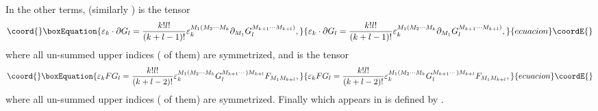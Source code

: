 \documentclass[a4paper,12pt]{article}
\begin{document}
In the other terms, \coordHE{} (similarly \coordHE{}) is the tensor
\begin{equation}\coord{}\boxEquation{
\varepsilon _{k}\cdot \partial G_{l}=\frac{k!l!}{\left( k+l-1\right) !}
\varepsilon _{k}^{M_{1}(M_{2}\cdots M_{k}}\partial
_{M_{1}}G_{l}^{M_{k+1}\cdots M_{k+l})},
}{
\varepsilon _{k}\cdot \partial G_{l}=\frac{k!l!}{\left( k+l-1\right) !}
\varepsilon _{k}^{M_{1}(M_{2}\cdots M_{k}}\partial
_{M_{1}}G_{l}^{M_{k+1}\cdots M_{k+l})},
}{ecuacion}\coordE{}\end{equation}
where all un-summed upper indices (\coordHE{} of them) are symmetrized, and \coordHE{} is the tensor
\begin{equation}\coord{}\boxEquation{
\varepsilon _{k}FG_{l}=\frac{k!l!}{\left( k+l-2\right) !}\varepsilon
_{k}^{M_{1}(M_{2}\cdots M_{k}}G_{l}^{M_{k+1}\cdots )M_{k+l}}F_{M_{1}M_{k+l}},
}{
\varepsilon _{k}FG_{l}=\frac{k!l!}{\left( k+l-2\right) !}\varepsilon
_{k}^{M_{1}(M_{2}\cdots M_{k}}G_{l}^{M_{k+1}\cdots )M_{k+l}}F_{M_{1}M_{k+l}},
}{ecuacion}\coordE{}\end{equation}
where all un-summed upper indices (\coordHE{} of them) are symmetrized. Finally
\coordHE{} which appears in \coordHE{} is defined by \coordHE{} .
\end{document}
